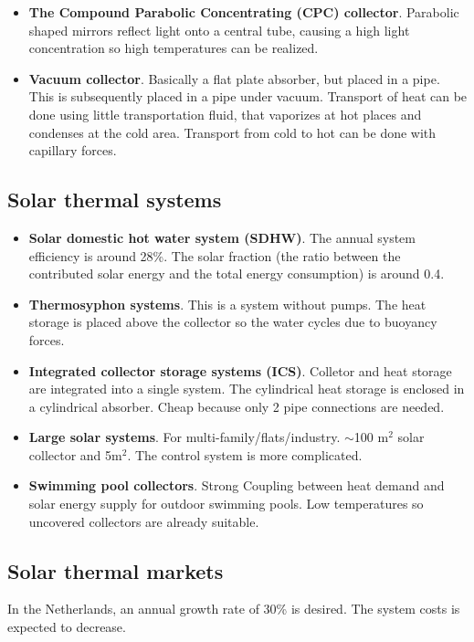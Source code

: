 \documentclass[a4paper,10pt]{article}
\begin{document}
\begin{itemize}
 \item \textbf{The Compound Parabolic Concentrating (CPC) collector}. Parabolic shaped mirrors reflect light onto a central tube, causing a high light concentration so high temperatures can be realized.
 \item \textbf{Vacuum collector}. Basically a flat plate absorber, but placed in a pipe. This is subsequently placed in a pipe under vacuum. Transport of heat can be done using little transportation fluid, that vaporizes at hot places and condenses at the cold area. Transport from cold to hot can be done with capillary forces.
\end{itemize}

\subsection{Solar thermal systems}
\begin{itemize}
\item \textbf{ Solar domestic hot water system (SDHW)}.
The annual system efficiency is around 28\%. The solar fraction (the ratio between the contributed solar energy and the total energy consumption) is around 0.4.

\item \textbf{ Thermosyphon systems}.
This is a system without pumps. The heat storage is placed above the collector so the water cycles due to buoyancy forces.

\item \textbf{ Integrated collector storage systems (ICS)}.
Colletor and heat storage are integrated into a single system. The cylindrical heat storage is enclosed in a cylindrical absorber. Cheap because only 2 pipe connections are needed.

\item \textbf{ Large solar systems}.
For multi-family/flats/industry. $\sim$100 m$^2$ solar collector and 5m$^2$. The control system is more complicated.

\item \textbf{ Swimming pool collectors}. Strong Coupling between heat demand and solar energy supply for outdoor swimming pools. Low temperatures so uncovered collectors are already suitable.
\end{itemize}

\subsection{Solar thermal markets}
In the Netherlands, an annual growth rate of 30\% is desired. The system costs is expected to decrease. 
\end{document}
